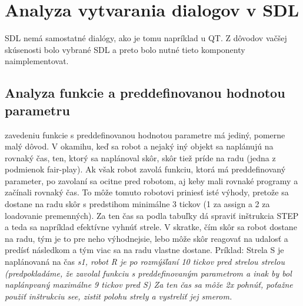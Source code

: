 \section{Analyza vytvarania dialogov v SDL}
SDL nemá samostatné dialógy, ako je tomu napríklad u QT. Z dôvodov vačšej skúsenosti bolo vybrané SDL a preto bolo nutné tieto komponenty naimplementovat. 
\subsection{Analyza funkcie a preddefinovanou hodnotou parametru}
zavedeniu funkcie s preddefinovanou hodnotou parametre má jediný, pomerne malý dôvod. V okamihu, keď sa robot a nejaký iný objekt sa naplánujú na rovnaký čas, ten, ktorý sa naplánoval skôr, skôr tiež príde na radu (jedna z podmienok fair-play). Ak však robot zavolá funkciu, ktorá má preddefinovaný parameter, po zavolaní sa ocitne pred robotom, aj keby mali rovnaké programy a začínali rovnaký čas. To môže tomuto robotovi priniesť isté výhody, pretože sa dostane na radu skôr s predstihom minimálne 3 tickov (1 za assign a 2 za loadovanie premenných). Za ten čas sa podla tabuľky dá spraviť inštrukcia STEP a teda sa napríklad efektívne vyhnúť strele. V skratke, čím skôr sa robot dostane na radu, tým je to pre neho výhodnejsie, lebo môže skôr reagovať na udalosť a predísť následkom a tým viac sa na radu vlastne dostane. Príklad: Strela S je naplánovaná na čas \it{s1}, robot R je po rozmýšľaní 10 tickov pred strelou strelou (predpokladáme, že zavolal funkciu s preddefinovaným parametrom a inak by bol naplánpvaný maximálne 9 tickov pred S) Za ten čas sa môže 2x pohnúť, poťažne použiť inštrukciu see, zistit polohu strely a vystreliť jej smerom.
